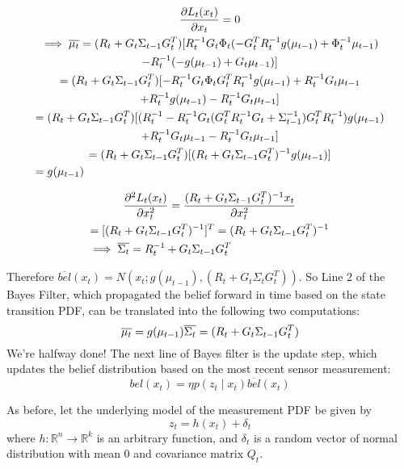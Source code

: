 \begin{multline*}
\frac{\partial L_t(x_t)}{\partial x_t} = 0 \\
\implies \overline{\mu_t} = (R_t + G_t\Sigma_{t-1}G_t^T) [R_t^{-1}G_t\Phi_t(-G_t^TR_t^{-1}g(\mu_{t-1}) + \Phi_t^{-1}\mu_{t-1}) \\ - R_t^{-1}(-g(\mu_{t-1}) + G_t\mu_{t-1})] \\
= (R_t + G_t\Sigma_{t-1}G_t^T) [-R_t^{-1}G_t\Phi_tG_t^TR_t^{-1}g(\mu_{t-1}) + R_t^{-1}G_t\mu_{t-1} \\ + R_t^{-1}g(\mu_{t-1}) - R_t^{-1}G_t\mu_{t-1}] \\
= (R_t + G_t\Sigma_{t-1}G_t^T) [(R_t^{-1} - R_t^{-1}G_t(G_t^TR_t^{-1}G_t + \Sigma_{t-1}^{-1})G_t^TR_t^{-1})g(\mu_{t-1}) \\
+ R_t^{-1}G_t\mu_{t-1} - R_t^{-1}G_t\mu_{t-1}] \\
= (R_t + G_t\Sigma_{t-1}G_t^T)[(R_t + G_t\Sigma_{t-1}G_t^T)^{-1} g(\mu_{t-1})] \\
= g(\mu_{t-1}) \hfill
\end{multline*}

\begin{multline*}
\frac{\partial^2 L_t(x_t) }{\partial x_t^2} = \frac{(R_t + G_t\Sigma_{t-1}G_t^T)^{-1}x_t}{\partial x_t^2} \\
= [(R_t + G_t\Sigma_{t-1}G_t^T)^{-1}]^T = (R_t + G_t\Sigma_{t-1}G_t^T)^{-1} \\
\implies \overline{\Sigma_t} = R_t^{-1} + G_t\Sigma_{t-1}G_t^T \hfill
\end{multline*}

Therefore \(\overline{bel}(x_t) = N(x_t;g(\mu_{t-1}),(R_t + G_t\Sigma_tG_t^T))\). So Line 2 of the Bayes Filter, which propagated the belief forward in time based on the state transition PDF, can be translated into the following two computations:
\[
\overline{\mu_t} = g(\mu_{t-1}) \\
\overline{\Sigma_t} = (R_t + G_t\Sigma_{t-1}G_t^T)
\]
We're halfway done! The next line of Bayes filter is the update step, which updates the belief distribution based on the most recent sensor measurement:
\[
bel(x_t) = \eta p(z_t \mathbin{\vert} x_t) \overline{bel}(x_t)
\]

As before, let the underlying model of the measurement PDF be given by \[z_t =  h(x_t) + \delta_t\] where \(h: \mathbb{R}^n \to \mathbb{R}^k\) is an arbitrary function, and \(\delta_t\) is a random vector of normal distribution with mean 0 and covariance matrix \(Q_t\).

